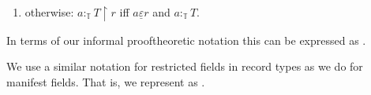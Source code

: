\begin{shaded}
\begin{ex}
\begin{enumerate}
\item otherwise:  $a:_{\mathbb{T}}T\!\restriction\!r$ iff $a\underline{\varepsilon} r$  and $a:_{\mathbb{T}}T$. 
\label{ex:restrictedtypes} 
\end{enumerate} 
   
\end{ex}

In terms of our informal prooftheoretic notation this can be expressed
as \nexteg{}.
\begin{ex} 
\begin{subex} 
 
\item
  \begin{prooftree}
  \end{prooftree}
  
 
\item
  \begin{prooftree}
  \end{prooftree}
  
  \begin{prooftree}
  \end{prooftree}
  \hspace*{2em}
  \begin{prooftree}
  \end{prooftree}
  \hspace*{2em}
  \begin{prooftree}
  \end{prooftree}
  
 
\end{subex} 
   
\end{ex} 
  
We use a similar notation for restricted fields in record types as we
do for manifest fields.  That is, we represent  as
.
\begin{ex} 
\begin{subex} 
 

\end{subex}
\end{ex}
\end{shaded}
